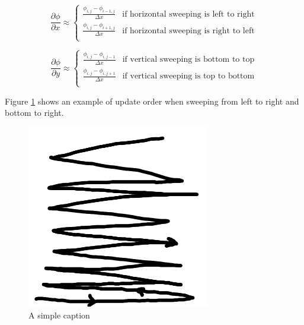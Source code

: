 \begin{equation}
\frac{\partial \phi}{\partial x} \approx
\left\{
\begin{array}{ll}
\frac{\phi_{i,j} - \phi_{i-1,j}}{\Delta x} & \mbox{if horizontal sweeping is left to right} \\
\frac{\phi_{i,j} - \phi_{i+1,j}}{\Delta x} & \mbox{if horizontal sweeping is right to left} \\
\end{array}
\right.
\end{equation}

\begin{equation}
\frac{\partial \phi}{\partial y} \approx
\left\{
\begin{array}{ll}
\frac{\phi_{i,j} - \phi_{i,j-1}}{\Delta x} & \mbox{if vertical sweeping is bottom to top} \\
\frac{\phi_{i,j} - \phi_{i,j+1}}{\Delta x} & \mbox{if vertical sweeping is top to bottom} \\
\end{array}
\right.
\end{equation}

Figure \ref{sweeppic} shows an example of update order when sweeping from left to right and bottom to right.

\begin{figure}[ht!]
\centering
\includegraphics[width=80mm]{ch4/sweep.png}
\caption{A simple caption}
\label{sweeppic}
\end{figure}

